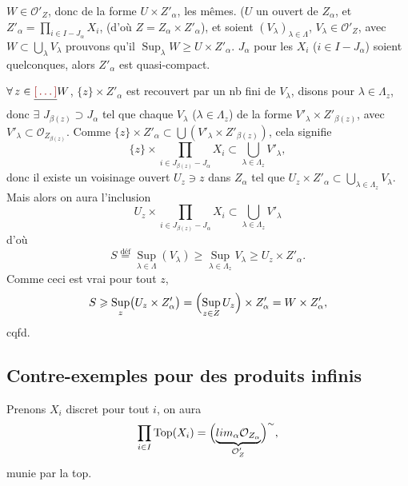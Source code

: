 \documentclass[11pt,a4paper]{article}
\begin{document}
$W \in \mathcal{O}'_{Z}$, donc de la forme $U \times Z'_{\alpha}$, les mêmes.
 ($U$ un ouvert de $Z_{\alpha}$, et $Z'_{\alpha} =
\prod_{i \in I - J_{\alpha}} X_{i}$, \struck{\ill{}} (d'où $Z = Z_{\alpha}
\times Z'_{\alpha}$), et soient $(V_{\lambda})_{\lambda \in \Lambda}$,
$V_{\lambda} \in \mathcal{O}'_{Z}$, avec $W \subset \bigcup_{\lambda}
V_{\lambda}$ \ill{} prouvons qu'il \struck{\ill{}}
$\operatorname*{Sup}_{\lambda} W \geqslant U \times Z'_{\alpha}$.
\struck{\ill{}} $J_{\alpha}$ \ill{} pour les $X_{i}$ ($i \in I - J_{\alpha}$)
soient \ill{} quelconques, alors $Z'_{\alpha}$ est quasi-compact.

$\forall\, z \in \struck{\ill{}} W$, $\{z\} \times Z'_{\alpha}$ est recouvert
par un nb fini de $V_{\lambda}$, disons pour $\lambda \in \Lambda_{z}$, donc
$\exists$ \struck{\ill{}} $J_{\beta(z)} \supset J_{\alpha}$ tel que chaque
$V_{\lambda}$ ($\lambda \in \Lambda_{z}$) de la forme $V'_{\lambda} \times
Z'_{\beta(z)}$, avec $V'_{\lambda} \subset \mathcal{O}_{Z_{\beta(z)}}$.
\struck{\ill{}} Comme $\{z\} \times Z'_{\alpha} \subset \bigcup(V'_{\lambda}
\times Z'_{\beta(z)})$, cela \struck{\ill{}} signifie
\[
\{z\} \times \prod_{i \in J_{\beta(z)} - J_{\alpha}} X_{i} \subset
\bigcup_{\lambda \in \Lambda_{z}} V'_{\lambda} ,
\]
donc il existe un voisinage ouvert $U_{z} \ni z$ dans $Z_{\alpha}$ tel que
$U_{z} \times Z'_{\alpha} \subset \bigcup_{\lambda \in \Lambda_{z}}
V_{\lambda}$. Mais alors \struck{\ill{}} on aura l'inclusion
\[
U_{z} \times \prod_{i \in J_{\beta(z)} - J_{\alpha}} X_{i} \subset
\bigcup_{\lambda \in \Lambda_{z}} V'_{\lambda}
\]
d'où
\[
S \overset{\text{déf}}{=} \operatorname*{Sup}_{\lambda \in \Lambda}(V_{\lambda})
\geqslant \operatorname*{Sup}_{\lambda \in \Lambda_{z}} V_{\lambda}
\geqslant U_{z} \times Z'_{\alpha} .
\]
Comme ceci est vrai pour tout $z$, \struck{\ill{}}
\[
S \geqslant \operatorname*{Sup}_{z}\bigl(U_{z} \times Z'_{\alpha}\bigr)
= \Bigl(\operatorname*{Sup}_{z \in Z} U_{z}\Bigr) \times Z'_{\alpha}
= W \times Z'_{\alpha} ,
\]
cqfd.

\subsection*{Contre-exemples pour des produits infinis}

Prenons $X_{i}$ discret pour tout $i$, on aura
\[
\prod_{i \in I} \operatorname{Top}(X_{i}) =
\Bigl(\underbrace{\varinjlim_{\alpha} \mathcal{O}_{Z_{\alpha}}}_{\mathcal{O}'_{Z}}\Bigr)^{\sim} ,
\]
munie par la top.
\end{document}
